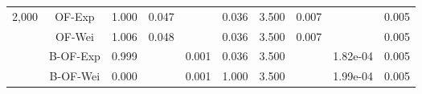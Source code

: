 \documentclass{article}
\begin{document}
\begin{landscape}
\begin{table}[h]
{\begin{tabular}{l| c |cccc|cccc}
							{2,000}&OF-Exp&1.000&0.047&&0.036&3.500&0.007&&0.005\\
							&OF-Wei& 1.006 & 0.048&&0.036&  3.500& 0.007&&0.005\\
							&B-OF-Exp&0.999&&0.001&0.036&3.500&&1.82e-04&0.005\\
							&B-OF-Wei& 0.000 & &0.001&1.000&3.500 & &1.99e-04&0.005\\\hline
							\hline
						\end{tabular}}
							\end{table}
\end{landscape}
\end{document}
